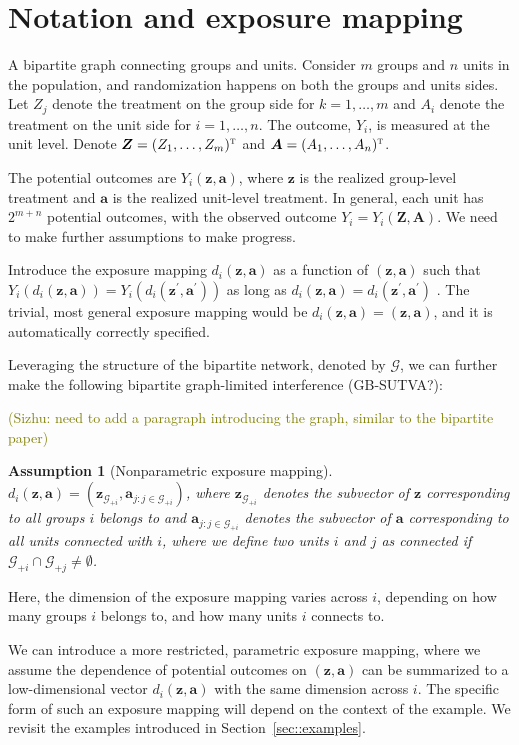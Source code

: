 \documentclass{article}
\newtheorem{assumption}{Assumption}
\def\T{{\textsc{t}}}
\newcommand{\bz}{\boldsymbol{z}}
\newcommand{\bZ}{\boldsymbol{Z}}
\newcommand{\ba}{\boldsymbol{a}}
\newcommand{\bA}{\boldsymbol{A}}
\newcommand{\cG}{\mathcal{G}}
\newcommand{\sz}[1]{{\textcolor{olive}{(Sizhu: #1)}}}
\begin{document}
\section{Notation and exposure mapping}

A bipartite graph connecting groups and units. Consider $m$ groups and $n$ units in the population, and randomization happens on both the groups and units sides. Let $Z_j$ denote the treatment on the group side for $k=1,\ldots,m$ and $A_i$ denote the treatment on the unit side for $i=1,\ldots,n$. The outcome, $Y_i$, is measured at the unit level. Denote $\bZ=(Z_1,\ldots,Z_m)^{\T}$ and $\bA=(A_1,\ldots,A_n)^{\T}$.

The potential outcomes are $Y_i(\bz, \ba)$, where $\bz$ is the realized group-level treatment and $\ba$ is the realized unit-level treatment. In general, each unit has $2^{m+n}$ potential outcomes, with the observed outcome $Y_i=Y_i(\bZ,\bA)$. We need to make further assumptions to make progress. 

Introduce the exposure mapping $d_i(\bz,\ba)$ as a function of $(\bz,\ba)$ such that $Y_i(d_i(\bz,\ba))=Y_i(d_i(\bz^{\prime},\ba^{\prime}))$ as long as $d_i(\bz,\ba) = d_i(\bz^{\prime},\ba^{\prime})$ \citep{aronow2017estimating}. The trivial, most general exposure mapping would be $d_i(\bz,\ba)=(\bz,\ba)$, and it is automatically correctly specified.

Leveraging the structure of the bipartite network, denoted by $\cG$, we can further make the following bipartite graph-limited interference (GB-SUTVA?):

\sz{need to add a paragraph introducing the graph, similar to the bipartite paper}

\begin{assumption}[Nonparametric exposure mapping]
\label{assump::exposure}
    $d_i(\bz,\ba) = (\bz_{\cG_{+i}},\ba_{j:j\in\cG_{+i}})$, where $\bz_{\cG_{+i}}$ denotes the subvector of $\bz$ corresponding to all groups $i$ belongs to and $\ba_{j:j\in\cG_{+i}}$ denotes the subvector of $\ba$ corresponding to all units connected with $i$, where we define two units $i$ and $j$ as connected if $\cG_{+i} \cap \cG_{+j} \neq \emptyset$.
\end{assumption}
Here, the dimension of the exposure mapping varies across $i$, depending on how many groups $i$ belongs to, and how many units $i$ connects to.

We can introduce a more restricted, parametric exposure mapping, where we assume the dependence of potential outcomes on $(\bz,\ba)$ can be summarized to a low-dimensional vector $d_i(\bz,\ba)$ with the same dimension across $i$. The specific form of such an exposure mapping will depend on the context of the example. We revisit the examples introduced in Section~\ref{sec::examples}.
\end{document}
